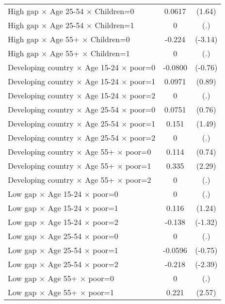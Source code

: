 {\begin{longtable}{l*{1}{cc}}
High gap $\times$ Age 25-54 $\times$ Children=0&      0.0617         &      (1.64)\\
High gap $\times$ Age 25-54 $\times$ Children=1&           0         &         (.)\\
High gap $\times$ Age 55+ $\times$ Children=0&      -0.224\sym{**} &     (-3.14)\\
High gap $\times$ Age 55+ $\times$ Children=1&           0         &         (.)\\
Developing country $\times$ Age 15-24 $\times$ poor=0&     -0.0800         &     (-0.76)\\
Developing country $\times$ Age 15-24 $\times$ poor=1&      0.0971         &      (0.89)\\
Developing country $\times$ Age 15-24 $\times$ poor=2&           0         &         (.)\\
Developing country $\times$ Age 25-54 $\times$ poor=0&      0.0751         &      (0.76)\\
Developing country $\times$ Age 25-54 $\times$ poor=1&       0.151         &      (1.49)\\
Developing country $\times$ Age 25-54 $\times$ poor=2&           0         &         (.)\\
Developing country $\times$ Age 55+ $\times$ poor=0&       0.114         &      (0.74)\\
Developing country $\times$ Age 55+ $\times$ poor=1&       0.335\sym{*}  &      (2.29)\\
Developing country $\times$ Age 55+ $\times$ poor=2&           0         &         (.)\\
Low gap $\times$ Age 15-24 $\times$ poor=0&           0         &         (.)\\
Low gap $\times$ Age 15-24 $\times$ poor=1&       0.116         &      (1.24)\\
Low gap $\times$ Age 15-24 $\times$ poor=2&      -0.138         &     (-1.32)\\
Low gap $\times$ Age 25-54 $\times$ poor=0&           0         &         (.)\\
Low gap $\times$ Age 25-54 $\times$ poor=1&     -0.0596         &     (-0.75)\\
Low gap $\times$ Age 25-54 $\times$ poor=2&      -0.218\sym{*}  &     (-2.39)\\
Low gap $\times$ Age 55+ $\times$ poor=0&           0         &         (.)\\
Low gap $\times$ Age 55+ $\times$ poor=1&       0.221\sym{*}  &      (2.57)\\

\end{longtable}}
